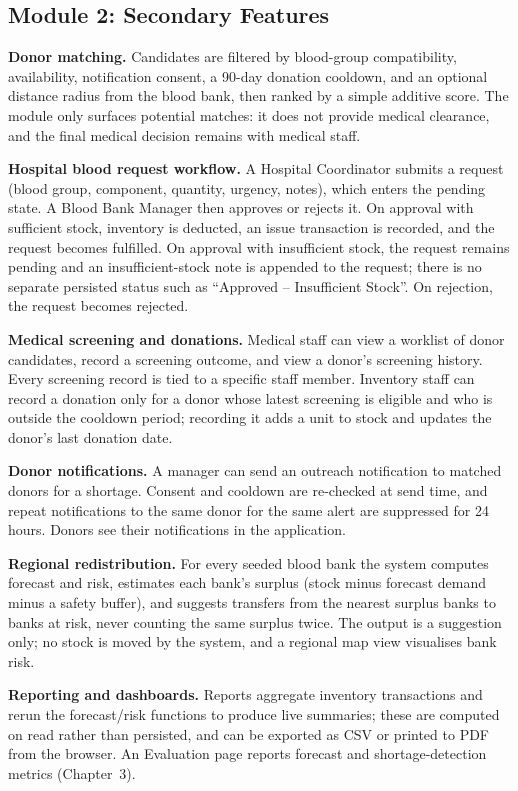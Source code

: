 \documentclass[12pt,a4paper,twoside]{report}
\begin{document}
\subsection{Module 2: Secondary Features}
\textbf{Donor matching.} Candidates are filtered by blood-group compatibility, availability, notification consent, a 90-day donation cooldown, and an optional distance radius from the blood bank, then ranked by a simple additive score. The module only surfaces potential matches: it does not provide medical clearance, and the final medical decision remains with medical staff.

\medskip\noindent\textbf{Hospital blood request workflow.} A Hospital Coordinator submits a request (blood group, component, quantity, urgency, notes), which enters the pending state. A Blood Bank Manager then approves or rejects it. On approval with sufficient stock, inventory is deducted, an issue transaction is recorded, and the request becomes fulfilled. On approval with insufficient stock, the request remains pending and an insufficient-stock note is appended to the request; there is no separate persisted status such as ``Approved -- Insufficient Stock''. On rejection, the request becomes rejected.

\medskip\noindent\textbf{Medical screening and donations.} Medical staff can view a worklist of donor candidates, record a screening outcome, and view a donor's screening history. Every screening record is tied to a specific staff member. Inventory staff can record a donation only for a donor whose latest screening is eligible and who is outside the cooldown period; recording it adds a unit to stock and updates the donor's last donation date.

\medskip\noindent\textbf{Donor notifications.} A manager can send an outreach notification to matched donors for a shortage. Consent and cooldown are re-checked at send time, and repeat notifications to the same donor for the same alert are suppressed for 24 hours. Donors see their notifications in the application.

\medskip\noindent\textbf{Regional redistribution.} For every seeded blood bank the system computes forecast and risk, estimates each bank's surplus (stock minus forecast demand minus a safety buffer), and suggests transfers from the nearest surplus banks to banks at risk, never counting the same surplus twice. The output is a suggestion only; no stock is moved by the system, and a regional map view visualises bank risk.

\medskip\noindent\textbf{Reporting and dashboards.} Reports aggregate inventory transactions and rerun the forecast/risk functions to produce live summaries; these are computed on read rather than persisted, and can be exported as CSV or printed to PDF from the browser. An Evaluation page reports forecast and shortage-detection metrics (Chapter~3).
\end{document}

